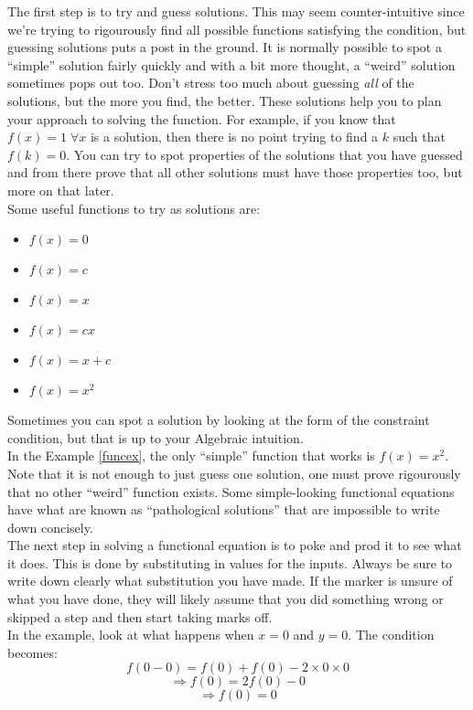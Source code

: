 \documentclass[a4paper,12pt]{article}
\begin{document}
The first step is to try and guess solutions. This may seem counter-intuitive since we're trying to rigourously find all possible functions satisfying the condition, but guessing solutions puts a post in the ground. It is normally possible to spot a ``simple'' solution fairly quickly and with a bit more thought, a ``weird'' solution sometimes pops out too.
Don't stress too much about guessing \emph{all} of the solutions, but the more you find, the better. These solutions help you to plan your approach to solving the function. For example, if you know that $f(x) = 1\; \forall x$ is a solution, then there is no point trying to find a $k$ such that $f(k) = 0$.
You can try to spot properties of the solutions that you have guessed and from there prove that all other solutions must have those properties too, but more on that later.\\

Some useful functions to try as solutions are:
\begin{itemize}
    \item $f(x) = 0$
    \item $f(x) = c$
    \item $f(x) = x$
    \item $f(x) = cx$
    \item $f(x) = x + c$
    \item $f(x) = x^2$
\end{itemize}
Sometimes you can spot a solution by looking at the form of the constraint condition, but that is up to your Algebraic intuition. \\

In the Example \ref{funcex}, the only ``simple'' function that works is $f(x) = x^2$. Note that it is not enough to just guess one solution, one must prove rigourously that no other ``weird'' function exists. Some simple-looking functional equations have what are known as ``pathological solutions'' that are impossible to write down concisely.\\

The next step in solving a functional equation is to poke and prod it to see what it does. This is done by substituting in values for the inputs. Always be sure to write down clearly what substitution you have made. If the marker is unsure of what you have done, they will likely assume that you did something wrong or skipped a step and then start taking marks off.\\
In the example, look at what happens when $x = 0$ and $y = 0$. The condition becomes:
$$ f(0 - 0) = f(0) + f(0) - 2 \times 0 \times 0$$
$$\Rightarrow f(0) = 2f(0) - 0$$
$$\Rightarrow f(0) = 0$$
\end{document}
